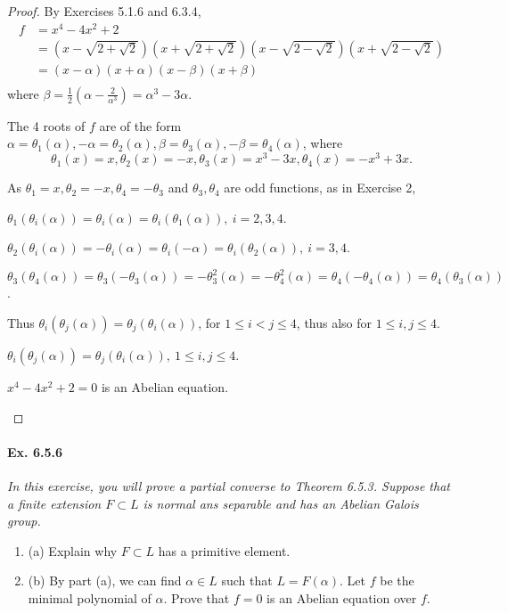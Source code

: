 \documentclass[11pt,a4paper]{article}
\newcommand{\be} {\begin{enumerate}}
\newcommand{\ee} {\end{enumerate}}
\begin{document}
\begin{proof}

By Exercises 5.1.6 and 6.3.4,
\begin{align*}
f&= x^4-4x^2+2\\
&= \left(x-\sqrt{2+\sqrt{2}}\right)\left(x+\sqrt{2+\sqrt{2}}\right)\left(x-\sqrt{2-\sqrt{2}}\right)\left(x+\sqrt{2-\sqrt{2}}\right)\\
&=(x-\alpha)(x+\alpha)(x-\beta)(x+\beta)\\
\end{align*}
where $\beta= \frac{1}{2}\left(\alpha- \frac{2}{\alpha^3}\right)  = \alpha^3-3\alpha$.

The 4 roots of $f$ are of the form $\alpha = \theta_1(\alpha), -\alpha = \theta_2(\alpha), \beta=\theta_3(\alpha), -\beta = \theta_4(\alpha)$, where
$$\theta_1(x) = x, \theta_2(x) = -x, \theta_3(x) = x^3-3x,\theta_4(x) = -x^3+3x.$$

As $\theta_1 = x, \theta_2 = -x, \theta_4 = -\theta_3$ and $\theta_3,\theta_4$ are odd functions, as in Exercise 2, 

 $\theta_1(\theta_i(\alpha)) = \theta_i(\alpha) = \theta_i(\theta_1(\alpha)),\ i=2,3,4$.

$\theta_2(\theta_i(\alpha)) = - \theta_i(\alpha) = \theta_i(-\alpha) = \theta_i(\theta_2(\alpha)),\ i=3,4$.

$\theta_3(\theta_4(\alpha)) = \theta_3(-\theta_3(\alpha)) = -\theta_3^2(\alpha) = -\theta_4^2(\alpha) = \theta_4(-\theta_4(\alpha)) = \theta_4(\theta_3(\alpha))$.

Thus $\theta_i(\theta_j(\alpha)) = \theta_j(\theta_i(\alpha))$, for $1\leq i <j\leq 4$, thus also for $1\leq i,j\leq 4$.

 $\theta_i(\theta_j(\alpha)) = \theta_j(\theta_i(\alpha)),\ 1\leq i,j\leq 4$. 
 \begin{center}
  $x^4-4x^2+2=0$ is an Abelian equation.
  \end{center}
\end{proof}

\paragraph{Ex. 6.5.6}

{\it In this exercise, you will prove a partial converse to Theorem 6.5.3. Suppose that a finite extension $F\subset L$ is normal ans separable and has an Abelian Galois group.
\be
\item[(a)] Explain why $F\subset L$ has a primitive element.
\item[(b)] By part (a), we can find $\alpha \in L$ such that $L = F(\alpha)$. Let $f$ be the minimal polynomial of $\alpha$. Prove that $f=0$ is an Abelian equation over $f$.
\ee
}
\end{document}
